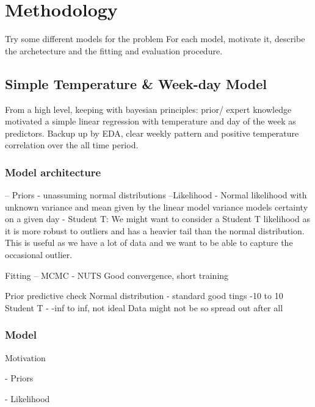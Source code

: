 \section{Methodology}

Try some different models for the problem 
For each model, motivate it, describe the archetecture and the fitting and evaluation procedure.

\subsection{Simple Temperature \& Week-day Model}
From a high level, keeping with bayesian principles: prior/ expert knowledge
motivated a simple linear regression with temperature and day of the week as
predictors. Backup up by EDA, clear weekly pattern and positive temperature
correlation over the all time period.

\subsubsection{Model architecture}

-- Priors 
  - unassuming normal distributions
--Likelihood
  - Normal likelihood with unknown variance and mean given by the linear model
  variance models certainty on a given day
  - Student T:
  We might want to consider a Student T likelihood as it is more robust to outliers
  and has a heavier tail than the normal distribution. This is useful as we have
  a lot of data and we want to be able to capture the occasional outlier.

Fitting
-- MCMC
  - NUTS
Good convergence, short training

Prior predictive check
  Normal distribution - standard good tings -10 to 10
  Student T - -inf to inf, not ideal 
  Data might not be so spread out after all


\subsubsection{Model}

Motivation


- Priors

- Likelihood 


